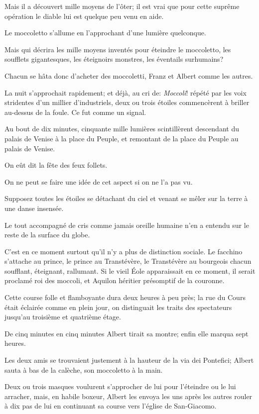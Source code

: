 Mais il a découvert mille moyens de l'ôter; il est vrai que pour cette suprême opération le diable lui est quelque peu venu en aide.  

Le moccoletto s'allume en l'approchant d'une lumière quelconque. 

Mais qui décrira les mille moyens inventés pour éteindre le moccoletto, les soufflets gigantesques, les éteignoirs monstres, les éventails surhumains? 

Chacun se hâta donc d'acheter des moccoletti, Franz et Albert comme les autres. 

La nuit s'approchait rapidement; et déjà, au cri de: \textit{Moccoli}! répété par les voix stridentes d'un millier d'industriels, deux ou trois étoiles commencèrent à briller au-dessus de la foule. Ce fut comme un signal. 

Au bout de dix minutes, cinquante mille lumières scintillèrent descendant du palais de Venise à la place du Peuple, et remontant de la place du Peuple au palais de Venise. 

On eût dit la fête des feux follets. 

On ne peut se faire une idée de cet aspect si on ne l'a pas vu. 

Supposez toutes les étoiles se détachant du ciel et venant se mêler sur la terre à une danse insensée. 

Le tout accompagné de cris comme jamais oreille humaine n'en a entendu sur le reste de la surface du globe. 

C'est en ce moment surtout qu'il n'y a plus de distinction sociale. Le facchino s'attache au prince, le prince au Transtévère, le Transtévère au bourgeois chacun soufflant, éteignant, rallumant. Si le vieil Éole apparaissait en ce moment, il serait proclamé roi des moccoli, et Aquilon héritier présomptif de la couronne. 

Cette course folle et flamboyante dura deux heures à peu près; la rue du Cours était éclairée comme en plein jour, on distinguait les traits des spectateurs jusqu'au troisième et quatrième étage. 

De cinq minutes en cinq minutes Albert tirait sa montre; enfin elle marqua sept heures. 

Les deux amis se trouvaient justement à la hauteur de la via dei Pontefici; Albert sauta à bas de la calèche, son moccoletto à la main. 

Deux ou trois masques voulurent s'approcher de lui pour l'éteindre ou le lui arracher, mais, en habile boxeur, Albert les envoya les uns après les autres rouler à dix pas de lui en continuant sa course vers l'église de San-Giacomo. 

